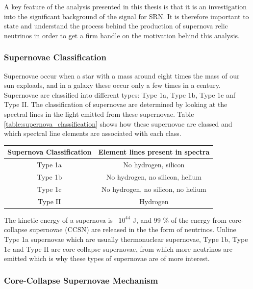 A key feature of the analysis presented in this thesis is that it is an investigation into the significant background of the signal for SRN. It is therefore important to state and understand the process behind the production of supernova relic neutrinos in order to get a firm handle on the motivation behind this analysis. 

\subsubsection{Supernovae Classification}
Supernovae occur when a star with a mass around eight times the mass of our sun exploads, and in a galaxy these occur only a few times in a century. Supernovae are classified into different types: Type 1a, Type 1b, Type 1c anf Type II. The classification of supernovae are determined by looking at the spectral lines in the light emitted from these supernovae. Table \ref{table:supernova_classification} shows how these supernovae are classed and which spectral line elements are associated with each class. 

\begin{center}
\begin{tabular}{||c c||} 
    \hline
    Supernova Classification & Element lines present in spectra \\ 
    \hline \hline
    Type 1a & No hydrogen, silicon  \\ 
    \hline
    Type 1b & No hydrogen, no silicon, helium  \\
    \hline
    Type 1c & No hydrogen, no silicon, no helium  \\
    \hline
    Type II & Hydrogen  \\
    \hline \hline
\end{tabular}
\label{table:supernova_classification}
\end{center}

The kinetic energy of a supernova is ~$10^{44}$ J, and 99 \% of the energy from core-collapse supernovae (CCSN) are released in the the form of neutrinos. Unline Type 1a supernovae which are usually thermonuclear supernovae, Type 1b, Type 1c and Type II are core-collapse supernovae, from which more neutrinos are emitted which is why these types of supernovae are of more interest. 

\subsubsection{Core-Collapse Supernovae Mechanism}

